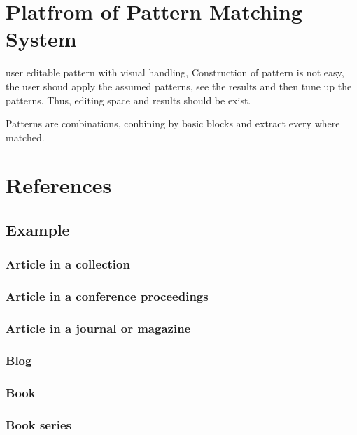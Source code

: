 \documentclass[11pt, onecolumn, twoside, a4paper]{article}
\begin{document}
\section{Platfrom of Pattern Matching System}
user editable pattern with visual handling, Construction of pattern is not easy, the
user shoud apply the assumed patterns, see the results and then tune up the patterns.
Thus, editing space and results should be exist.

Patterns are combinations, conbining by basic blocks and extract every where matched.








\section{References}


\subsection{Example}
\subsubsection{Article in a collection}
\subsubsection{Article in a conference proceedings}
\subsubsection{Article in a journal or magazine}
\subsubsection{Blog}
\subsubsection{Book}
\subsubsection{Book series}
\end{document}
